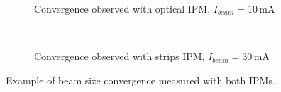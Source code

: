 \begin{figure}[!ht]
  \begin{subfigure}[t]{0.5\textwidth}
    
    \caption{Convergence observed with optical IPM, $I_{beam} = 10\,\mathrm{mA}$}
    \label{chap4:fig:fig000_HT_size_a}
  \end{subfigure}
  ~
  \begin{subfigure}[t]{0.5\textwidth}
    
    \caption{Convergence observed with strips IPM, $I_{beam} = 30\,\mathrm{mA}$}
    \label{chap4:fig:fig000_HT_size_b}
  \end{subfigure}
  \caption[Example of beam size convergence measured with both IPMs]{Example of beam size convergence measured with both IPMs.}
  \label{chap4:fig:fig000_HT_size}
\end{figure}
